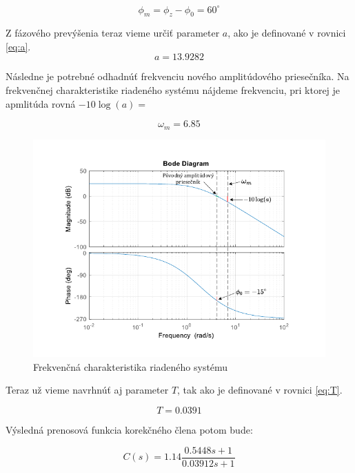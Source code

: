 \documentclass[a4paper,10pt]{article}
\begin{document}
\begin{equation}
\phi_m=\phi_z-\phi_0=60^\circ
\end{equation}

Z fázového prevýšenia teraz vieme určiť parameter $a$, ako je definované v rovnici \eqref{eq:a}.
\begin{equation}
 a=13.9282
\end{equation} 

Následne je potrebné odhadnúť frekvenciu nového amplitúdového priesečníka.
Na frekvenčnej charakteristike riadeného systému nájdeme frekvenciu, pri ktorej je apmlitúda rovná $-10\log(a)=$

\begin{equation}
 \omega_m=6.85
\end{equation}

\begin{figure}[ht]
\centering
\includegraphics[width=1.0\textwidth]{SystemBode}
\caption{Frekvenčná charakteristika riadeného systému}
\end{figure}

\pagebreak

Teraz už vieme navrhnúť aj parameter $T$, tak ako je definované v rovnici \eqref{eq:T}.

\begin{equation}
 T=0.0391
\end{equation}  

Výsledná prenosová funkcia korekčného člena potom bude:

\begin{equation}
 C(s)=1.14\frac{0.5448s+1}{0.03912s+1}
\end{equation}
\end{document}
